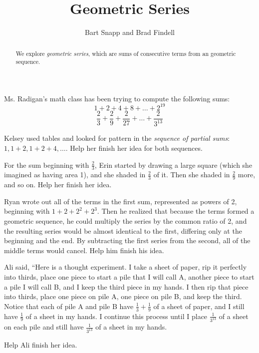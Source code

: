 \documentclass[nooutcomes]{ximera}
\title{Geometric Series}
\author{Bart Snapp and Brad Findell}
\begin{document}
\begin{abstract}
We explore \emph{geometric series}, which are sums of consecutive
terms from an geometric sequence.
\end{abstract}
\maketitle

\label{A:geometicSeries}

Ms. Radigan's math class has been trying to compute the following sums:  
$$1+2+4+8+\dots+2^{19}$$
$$\frac{2}{3}+\frac{2}{9}+\frac{2}{27}+\dots+\frac{2}{3^{13}}$$

\begin{problem}
Kelsey used tables and looked for pattern in the \emph{sequence of partial sums}:  $1, 1+2, 1+2+4, \dots$.  Help her finish her idea for both sequences.    
\end{problem}

\begin{problem}
For the sum beginning with $\frac{2}{3}$, Erin started by drawing a large square (which she imagined as having area 1), and she shaded in $\frac{2}{3}$ of it.  Then she shaded in $\frac{2}{9}$ more, and so on.  Help her finish her idea.  
\end{problem}

\begin{problem}
Ryan wrote out all of the terms in the first sum, represented as powers of 2, beginning with $1+2+2^2+2^3$.  
Then he realized that because the terms formed a geometric sequence, he could multiply the series by the common ratio of 2, and the resulting series would be almost identical to the first, differing only at the beginning and the end.  By subtracting the first series from the second, all of the middle terms would cancel.  Help him finish his idea.  
\end{problem}

\begin{problem}
Ali said, ``Here is a thought experiment.  I take a sheet of paper, rip it perfectly into thirds, place one piece to start a pile that I will call A, another piece to start a pile I will call B, and I keep the third piece in my hands.  I then rip that piece into thirds, place one piece on pile A, one piece on pile B, and keep the third.  Notice that each of pile A and pile B have $\frac{1}{3}+\frac{1}{9}$ of a sheet of paper, and I still have $\frac{1}{9}$ of a sheet in my hands.  I continue this process until I place $\frac{1}{3^{13}}$ of a sheet on each pile and still have $\frac{1}{3^{13}}$ of a sheet in my hands.  

Help Ali finish her idea.  
\end{problem}
\end{document}
